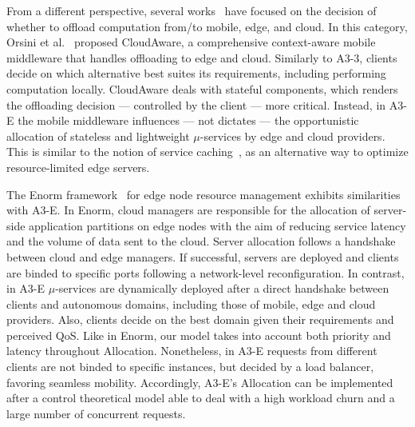 From a different perspective, several works~\cite{ZhaoZGZN15, Liu:2016, OrsiniBL16, Xu:2018} have focused on the decision of whether to offload computation from/to mobile, edge, and cloud. 
In this category, Orsini et al.~\cite{OrsiniBL16} proposed CloudAware, a comprehensive context-aware mobile middleware that handles offloading to edge and cloud. Similarly to A3-3, clients decide on which alternative best suites its requirements, including performing computation locally. CloudAware deals with stateful components, which renders the offloading decision --- controlled by the client --- more critical. Instead, in A3-E the mobile middleware influences --- not dictates --- the opportunistic allocation of stateless and lightweight $\mu$-services by edge and cloud providers. This is similar to the notion of service caching~\cite{Xu18infocom}, as an alternative way to optimize resource-limited edge servers.


The Enorm framework~\cite{wang2017enorm} for edge node resource management exhibits similarities with A3-E. In Enorm, cloud managers are responsible for the allocation of server-side application partitions on edge nodes with the aim of reducing service latency and the volume of data sent to the cloud. Server allocation follows a handshake between cloud and edge managers. If successful, servers are deployed and clients are binded to specific ports following a network-level reconfiguration. In contrast, in A3-E $\mu$-services are dynamically deployed after a direct handshake between clients and autonomous domains, including those of mobile, edge and cloud providers. Also, clients decide on the best domain given their requirements and perceived QoS. Like in Enorm, our model takes into account both priority and latency throughout Allocation. Nonetheless, in A3-E requests from different clients are not binded to specific instances, but decided by a load balancer, favoring seamless mobility. Accordingly, A3-E's Allocation can be implemented after a control theoretical model able to deal with a high workload churn and a large number of concurrent requests. 

